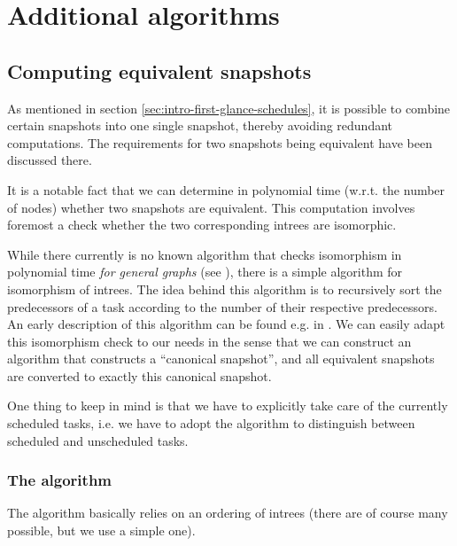 \chapter{Additional algorithms}
\label{sec:additional-algs}

\newcommand{\treegeq}{\stackrel{\text{LEX}}{\geq}}

\section{Computing equivalent snapshots}
\label{sec:algorithm-equivalent-snapshot}

As mentioned in section \ref{sec:intro-first-glance-schedules}, it is possible to combine certain snapshots into one single snapshot, thereby avoiding redundant computations. The requirements for two snapshots being equivalent have been discussed there.

It is a notable fact that we can determine in polynomial time (w.r.t. the number of nodes) whether two snapshots are equivalent. This computation involves foremost a check whether the two corresponding intrees are isomorphic. 


While there currently is no known algorithm that checks isomorphism in polynomial time \emph{for general graphs} (see \cite{arora2009computational}), there is a simple algorithm for isomorphism of intrees. The idea behind this algorithm is to recursively sort the predecessors of a task according to the number of their respective predecessors. An early description of this algorithm can be found e.g. in \cite{aho1974design}. We can easily adapt this isomorphism check to our needs in the sense that we can construct an algorithm that constructs a ``canonical snapshot'', and all equivalent snapshots are converted to exactly this canonical snapshot.

One thing to keep in mind is that we have to explicitly take care of the currently scheduled tasks, i.e. we have to adopt the algorithm to distinguish between scheduled and unscheduled tasks.

\subsection{The algorithm}
\label{sec:algorithm-equiv-snapshots-actual-algo}

The algorithm basically relies on an ordering of intrees (there are of course many possible, but we use a simple one).

